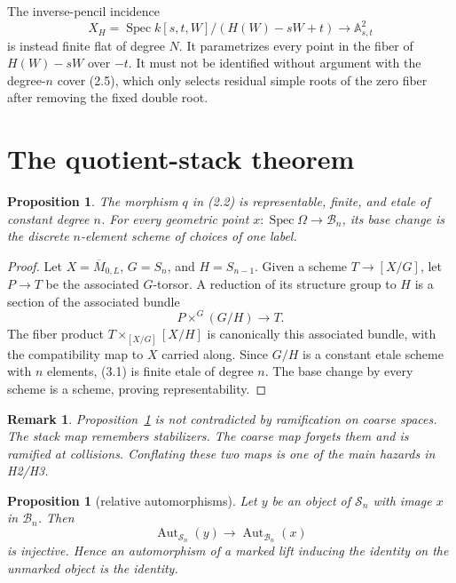 \documentclass[11pt]{article}
\newtheorem{proposition}[theorem]{Proposition}
\newtheorem{remark}[theorem]{Remark}
\newcommand{\A}{\mathbb A}
\newcommand{\Spec}{\operatorname{Spec}}
\newcommand{\Aut}{\operatorname{Aut}}
\newcommand{\ol}{\overline}
\begin{document}
The inverse-pencil incidence
\[
 X_H=\Spec k[s,t,W]/(H(W)-sW+t)\longrightarrow\A^2_{s,t}             \tag{2.6}
\]
is instead finite flat of degree $N$.  It parametrizes every point in the
fiber of $H(W)-sW$ over $-t$.  It must not be identified without argument
with the degree-$n$ cover (2.5), which only selects residual simple roots of
the zero fiber after removing the fixed double root.

\section{The quotient-stack theorem}

\begin{proposition}\label{prop:quotient}
The morphism $q$ in (2.2) is representable, finite, and etale of constant
degree $n$.  For every geometric point $x:\Spec\Omega\to\mathscr B_n$, its
base change is the discrete $n$-element scheme of choices of one label.
\end{proposition}

\begin{proof}
Let $X=\ol M_{0,L}$, $G=S_n$, and $H=S_{n-1}$.  Given a scheme
$T\to[X/G]$, let $P\to T$ be the associated $G$-torsor.  A reduction of its
structure group to $H$ is a section of the associated bundle
\[
 P\times^G(G/H)\longrightarrow T.                                    \tag{3.1}
\]
The fiber product $T\times_{[X/G]}[X/H]$ is canonically this associated
bundle, with the compatibility map to $X$ carried along.  Since $G/H$ is a
constant etale scheme with $n$ elements, (3.1) is finite etale of degree
$n$.  The base change by every scheme is a scheme, proving representability.
\end{proof}

\begin{remark}
Proposition~\ref{prop:quotient} is not contradicted by ramification on coarse
spaces.  The stack map remembers stabilizers.  The coarse map forgets them
and is ramified at collisions.  Conflating these two maps is one of the main
hazards in H2/H3.
\end{remark}

\begin{proposition}[relative automorphisms]\label{prop:aut}
Let $y$ be an object of $\mathscr S_n$ with image $x$ in $\mathscr B_n$.
Then
\[
 \Aut_{\mathscr S_n}(y)\longrightarrow\Aut_{\mathscr B_n}(x)
\]
is injective.  Hence an automorphism of a marked lift inducing the identity
on the unmarked object is the identity.
\end{proposition}
\end{document}

